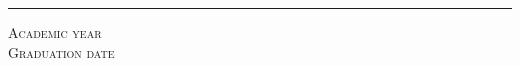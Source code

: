 \begin{titlepage}
\begin{center}
    \vspace{-1.5cm}
    \vfill
    \noindent\rule{\textwidth}{0.5pt}
    \begin{normalsize}
    \textsc{Academic year}\\
    \textsc{Graduation date}\\
    \end{normalsize}
  \end{center}
  \makeatother
\end{titlepage}